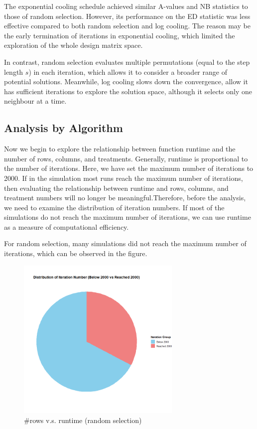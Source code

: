 \documentclass[
  a4paper,
  oneside,
  openany,
  12pt,
  onecolumn]{book}
\theoremstyle{definition}
\theoremstyle{plain}
\theoremstyle{remark}
\begin{document}
The exponential cooling schedule achieved similar A-values and NB
statistics to those of random selection. However, its performance on the
ED statistic was less effective compared to both random selection and
log cooling. The reason may be the early termination of iterations in
exponential cooling, which limited the exploration of the whole design
matrix space.

In contrast, random selection evaluates multiple permutations (equal to
the step length \(s\)) in each iteration, which allows it to consider a
broader range of potential solutions. Meanwhile, log cooling slows down
the convergence, allow it has sufficient iterations to explore the
solution space, although it selects only one neighbour at a time.

\subsection{Analysis by Algorithm}\label{analysis-by-algorithm}

Now we begin to explore the relationship between function runtime and
the number of rows, columns, and treatments. Generally, runtime is
proportional to the number of iterations. Here, we have set the maximum
number of iterations to 2000. If in the simulation most runs reach the
maximum number of iterations, then evaluating the relationship between
runtime and rows, columns, and treatment numbers will no longer be
meaningful.Therefore, before the analysis, we need to examine the
distribution of iteration numbers. If most of the simulations do not
reach the maximum number of iterations, we can use runtime as a measure
of computational efficiency.

For random selection, many simulations did not reach the maximum number
of iterations, which can be observed in the figure.

\begin{figure}[H]

{\centering \includegraphics[width=0.7\textwidth,height=\textheight]{images/Rplots/RS_eva/RS-iternum-distribution.png}

}

\caption{\#rows v.s. runtime (random selection)}

\end{figure}%
\end{document}
